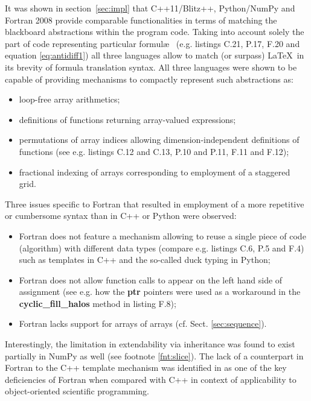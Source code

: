 \documentclass[review,peprint,10pt,5p,times]{elsarticle}
\newcommand{\prog}[1]{{\rm\bf#1}}
\begin{document}
  It was shown in section~\ref{sec:impl} that C++11/Blitz++, Python/NumPy and Fortran 2008
    provide comparable functionalities in terms of matching the blackboard abstractions
    within the program code.
  Taking into account solely the part of code representing particular formul\ae~
    (e.g. listings C.21, P.17, F.20 and equation \ref{eq:antidiff1}) all three
    languages allow to match (or surpass) \LaTeX~in its brevity of formula translation syntax.
  All three languages were shown to be capable of providing mechanisms to compactly represent such abstractions as:
  \begin{itemize}
    \item{loop-free array arithmetics;}
    \item{definitions of functions returning array-valued expressions;}
    \item{permutations of array indices allowing dimension-independent definitions
      of functions (see e.g. listings C.12 and C.13, P.10 and P.11, F.11 and F.12);}
    \item{fractional indexing of arrays corresponding to employment of a staggered grid.}
  \end{itemize}
  Three issues specific to Fortran that 
    resulted in employment of a more repetitive or cumbersome syntax than in C++ or Python
    were observed:
  \begin{itemize}
    \item{Fortran does not feature a mechanism allowing to reuse a single piece of code (algorithm)
      with different data types (compare e.g. listings C.6, P.5 and F.4) such as
      templates in C++ and the so-called duck typing in Python;}
    \item{Fortran does not allow function calls to appear on the left hand side
      of assignment (see e.g. how the \prog{ptr} pointers were used as a workaround in the \prog{cyclic\_fill\_halos}
      method in listing F.8);}
    \item{Fortran lacks support for arrays of arrays (cf. Sect. \ref{sec:sequence}).}
  \end{itemize}
  Interestingly, the limitation in extendability via inheritance was found to
    exist partially in NumPy as well (see footnote \ref{fnt:slice}).
  The lack of a counterpart in Fortran to the C++ template mechanism was identified in
    \citep{Cary_et_al_1997}
    as one of the key deficiencies of Fortran when compared with C++ in context 
    of applicability to object-oriented scientific programming.
\end{document}

